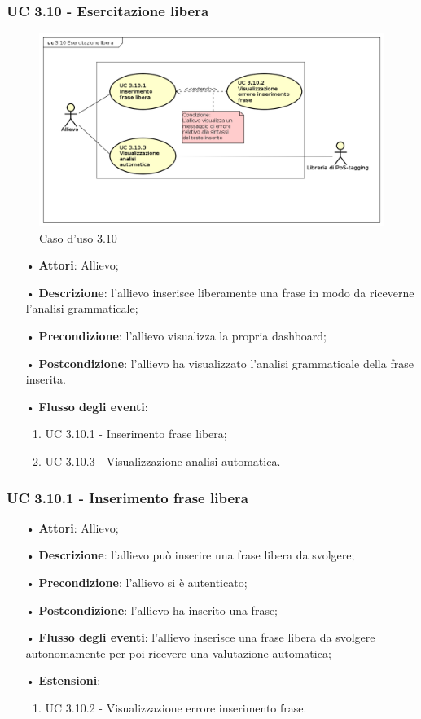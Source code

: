 \subsubsection{UC 3.10 - Esercitazione libera}
\begin{figure}[H]
	\centering
	\includegraphics[width=17cm]{img/UC310.png} 
	\caption{Caso d'uso 3.10}\label{fig:310}
\end{figure}
\begin{itemize}
\item[•]\textbf{Attori}: Allievo;
\item[•]\textbf{Descrizione}: l'allievo inserisce liberamente una frase in modo da riceverne l'analisi grammaticale;
\item[•]\textbf{Precondizione}: l'allievo visualizza la propria dashboard;
\item[•]\textbf{Postcondizione}: l'allievo ha visualizzato l'analisi grammaticale della frase inserita.
\item[•]\textbf{Flusso degli eventi}:
\begin{enumerate}
	\item UC 3.10.1 - Inserimento frase libera;
	\item UC 3.10.3 - Visualizzazione analisi automatica.
\end{enumerate}
\end{itemize}

\subsubsection{UC 3.10.1 - Inserimento frase libera}
\begin{itemize}
	\item[•]\textbf{Attori}: Allievo;
	\item[•]\textbf{Descrizione}: l'allievo può inserire una frase libera da svolgere;
	\item[•]\textbf{Precondizione}: l'allievo si è autenticato;
	\item[•]\textbf{Postcondizione}: l'allievo ha inserito una frase;
	\item[•]\textbf{Flusso degli eventi}: l'allievo inserisce una frase libera da svolgere autonomamente per poi ricevere una valutazione automatica;
	\item[•]\textbf{Estensioni}:
	\begin{enumerate}
		\item UC 3.10.2 - Visualizzazione errore inserimento frase.
	\end{enumerate}
\end{itemize}

